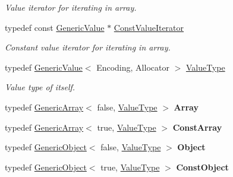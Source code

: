 \begin{DoxyCompactItemize}
\begin{DoxyCompactList}\small\item\em Value iterator for iterating in array. \end{DoxyCompactList}\item 
typedef const \hyperlink{class_generic_value}{Generic\+Value} $\ast$ \hyperlink{class_generic_value_a49010c6d6886f96ff0b0c51bccc7f6ea}{Const\+Value\+Iterator}\hypertarget{class_generic_value_a49010c6d6886f96ff0b0c51bccc7f6ea}{}\label{class_generic_value_a49010c6d6886f96ff0b0c51bccc7f6ea}

\begin{DoxyCompactList}\small\item\em Constant value iterator for iterating in array. \end{DoxyCompactList}\item 
typedef \hyperlink{class_generic_value}{Generic\+Value}$<$ Encoding, Allocator $>$ \hyperlink{class_generic_value_a43a39bb4fca9b9d3de3da6ac353d25ce}{Value\+Type}\hypertarget{class_generic_value_a43a39bb4fca9b9d3de3da6ac353d25ce}{}\label{class_generic_value_a43a39bb4fca9b9d3de3da6ac353d25ce}

\begin{DoxyCompactList}\small\item\em Value type of itself. \end{DoxyCompactList}\item 
typedef \hyperlink{class_generic_array}{Generic\+Array}$<$ false, \hyperlink{class_generic_value_a43a39bb4fca9b9d3de3da6ac353d25ce}{Value\+Type} $>$ {\bfseries Array}\hypertarget{class_generic_value_a149e12992b8f6064c865a4cf55981b89}{}\label{class_generic_value_a149e12992b8f6064c865a4cf55981b89}

\item 
typedef \hyperlink{class_generic_array}{Generic\+Array}$<$ true, \hyperlink{class_generic_value_a43a39bb4fca9b9d3de3da6ac353d25ce}{Value\+Type} $>$ {\bfseries Const\+Array}\hypertarget{class_generic_value_a8f1d2728de56600b5f3df596e2a8a181}{}\label{class_generic_value_a8f1d2728de56600b5f3df596e2a8a181}

\item 
typedef \hyperlink{class_generic_object}{Generic\+Object}$<$ false, \hyperlink{class_generic_value_a43a39bb4fca9b9d3de3da6ac353d25ce}{Value\+Type} $>$ {\bfseries Object}\hypertarget{class_generic_value_aee3606d69d411ce0d98f29639585989b}{}\label{class_generic_value_aee3606d69d411ce0d98f29639585989b}

\item 
typedef \hyperlink{class_generic_object}{Generic\+Object}$<$ true, \hyperlink{class_generic_value_a43a39bb4fca9b9d3de3da6ac353d25ce}{Value\+Type} $>$ {\bfseries Const\+Object}\hypertarget{class_generic_value_a55ad310f5434e0e4a93df616b326ba7e}{}\label{class_generic_value_a55ad310f5434e0e4a93df616b326ba7e}

\end{DoxyCompactItemize}
